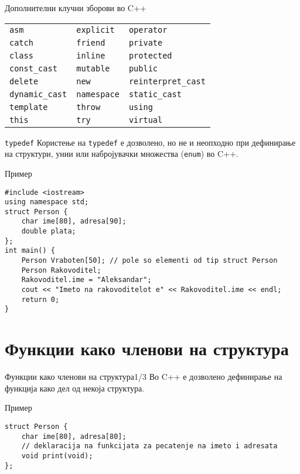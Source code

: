 \begin{frame}{Дополнителни клучни зборови во C++}
\begin{center}
    \begin{tabular}{l l l}
        \texttt{asm} & \texttt{explicit} & \texttt{operator}  \\
        \texttt{catch} & \texttt{friend} & \texttt{private} \\
        \texttt{class} & \texttt{inline} & \texttt{protected} \\ 
        \texttt{const\_cast} & \texttt{mutable} & \texttt{public} \\ 
        \texttt{delete} & \texttt{new} & \texttt{reinterpret\_cast} \\
        \texttt{dynamic\_cast} & \texttt{namespace} & \texttt{static\_cast} \\ 
        \texttt{template} & \texttt{throw} & \texttt{using} \\
        \texttt{this} & \texttt{try} & \texttt{virtual}
    \end{tabular}
\end{center}    
\end{frame}

\begin{frame}[fragile]{\texttt{typedef}}
Користење на \texttt{typedef} е дозволено, но не и неопходно при дефинирање на структури,
унии или набројувачки множества (\texttt{enum}) во C++.
\begin{exampleblock}{Пример}
\begin{lstlisting}
#include <iostream>
using namespace std;
struct Person {
    char ime[80], adresa[90];
    double plata;
};
int main() {
    Person Vraboten[50]; // pole so elementi od tip struct Person
    Person Rakovoditel;
    Rakovoditel.ime = "Aleksandar";
    cout << "Imeto na rakovoditelot e" << Rakovoditel.ime << endl;
    return 0;
}
\end{lstlisting}
\end{exampleblock}
\end{frame}

\section{Функции како членови на структура}

\begin{frame}[fragile]{Функции како членови на структура}{1/3}
Во C++ е дозволено дефинирање на функција како дел од некоја структура.
\begin{exampleblock}{Пример}
\begin{lstlisting}
struct Person {
    char ime[80], adresa[80];
    // deklaracija na funkcijata za pecatenje na imeto i adresata
    void print(void);
};
\end{lstlisting}
\end{exampleblock}
\end{frame}

